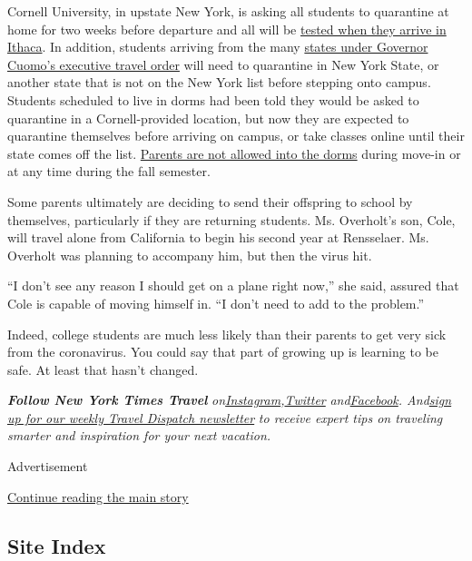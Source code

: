Cornell University, in upstate New York, is asking all students to
quarantine at home for two weeks before departure and all will be
\href{https://covid.cornell.edu/students/move-in/}{tested when they
arrive in Ithaca}. In addition, students arriving from the many
\href{https://coronavirus.health.ny.gov/covid-19-travel-advisory}{states
under Governor Cuomo's executive travel order} will need to quarantine
in New York State, or another state that is not on the New York list
before stepping onto campus. Students scheduled to live in dorms had
been told they would be asked to quarantine in a Cornell-provided
location, but now they are expected to quarantine themselves before
arriving on campus, or take classes online until their state comes off
the list. \href{https://covid.cornell.edu/students/move-in/}{Parents are
not allowed into the dorms} during move-in or at any time during the
fall semester.

Some parents ultimately are deciding to send their offspring to school
by themselves, particularly if they are returning students. Ms.
Overholt's son, Cole, will travel alone from California to begin his
second year at Rensselaer. Ms. Overholt was planning to accompany him,
but then the virus hit.

``I don't see any reason I should get on a plane right now,'' she said,
assured that Cole is capable of moving himself in. ``I don't need to add
to the problem.''

Indeed, college students are much less likely than their parents to get
very sick from the coronavirus. You could say that part of growing up is
learning to be safe. At least that hasn't changed.

\emph{\textbf{Follow New York Times Travel}}
\emph{on}\href{https://www.instagram.com/nytimestravel/}{\emph{Instagram}}\emph{,}\href{https://twitter.com/nytimestravel}{\emph{Twitter}}
\emph{and}\href{https://www.facebookcorewwwi.onion/nytimestravel/}{\emph{Facebook}}\emph{.
And}\href{https://www.nytimes3xbfgragh.onion/newsletters/traveldispatch}{\emph{sign
up for our weekly Travel Dispatch newsletter}} \emph{to receive expert
tips on traveling smarter and inspiration for your next vacation.}

Advertisement

\protect\hyperlink{after-bottom}{Continue reading the main story}

\hypertarget{site-index}{%
\subsection{Site Index}\label{site-index}}

